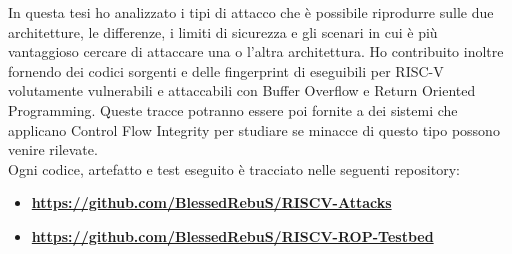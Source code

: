 In questa tesi ho analizzato i tipi di attacco che è possibile riprodurre sulle due architetture, le differenze, i limiti di sicurezza e gli scenari in cui è più vantaggioso cercare di attaccare una o l'altra architettura. Ho contribuito inoltre fornendo dei codici sorgenti e delle fingerprint di eseguibili per RISC-V volutamente vulnerabili e attaccabili con Buffer Overflow e Return Oriented Programming. Queste tracce potranno essere poi fornite a dei sistemi che applicano Control Flow Integrity per studiare se minacce di questo tipo possono venire rilevate.\\
Ogni codice, artefatto e test eseguito è tracciato nelle seguenti repository:\\
\begin{itemize}
    \item \href{https://github.com/BlessedRebuS/RISCV-Attacks}{\textbf{https://github.com/BlessedRebuS/RISCV-Attacks}}
    \item \href{https://github.com/BlessedRebuS/RISCV-ROP-Testbed}{\textbf{https://github.com/BlessedRebuS/RISCV-ROP-Testbed}}
\end{itemize}
\newpage
\newpage